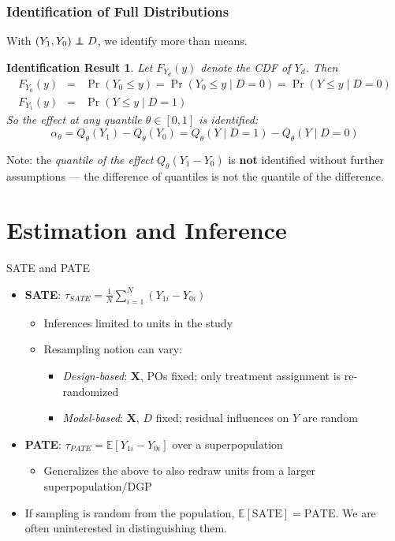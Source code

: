 \documentclass[xcolor=dvipsnames]{beamer}
\newcommand\E{\mathbb{E}}
\newcommand\X{{\bm X}}
\newcommand\indep{\protect\mathpalette{\protect\independenT}{\perp}}
\def\independenT#1#2{\mathrel{\rlap{$#1#2$}\mkern2mu{#1#2}}}
\newtheorem{ires}{Identification Result}
\begin{document}
\begin{frame}
\frametitle{Identification of Full Distributions}
\small
With $(Y_1,Y_0) \indep D$, we identify more than means.

\begin{ires}\small
Let $F_{Y_d}(y)$ denote the CDF of $Y_d$.  Then
\begin{eqnarray*}
F_{Y_0}(y) &=& \Pr(Y_0\leq y) = \Pr(Y_0\leq y \mid D=0) = \Pr(Y\leq y \mid D=0) \\
F_{Y_1}(y) &=& \Pr(Y\leq y \mid D=1)
\end{eqnarray*}
So the effect at any quantile $\theta\in[0,1]$ is identified:
\[
\alpha_{\theta}=Q_\theta(Y_1)-Q_\theta(Y_0)=Q_\theta(Y\mid D\!=\!1)-Q_\theta(Y\mid D\!=\!0)
\]
\end{ires}

\pause
\medskip
Note: the \textit{quantile of the effect} $Q_\theta(Y_1 - Y_0)$ is \textbf{not} identified without further assumptions --- the difference of quantiles is not the quantile of the difference.
\end{frame}


\section{Estimation and Inference}

\begin{frame}{SATE and PATE}
\small
\begin{itemize}
\item<1-> \textbf{SATE}: $\tau_{SATE} = \frac{1}{N}\sum_{i=1}^N (Y_{1i} - Y_{0i})$ \medskip
  \begin{itemize}
  \footnotesize
   \item Inferences limited to units in the study
   \item Resampling notion can vary:
   \begin{itemize}
   \scriptsize
   \item \textit{Design-based}: $\X$, POs fixed; only treatment assignment is re-randomized
   \item \textit{Model-based}: $\X$, $D$ fixed; residual influences on $Y$ are random
   \end{itemize}
  \end{itemize}\bigskip
\item<2-> \textbf{PATE}: $\tau_{PATE} = \E[Y_{1i} - Y_{0i}]$ over a superpopulation \medskip
 \begin{itemize}
  \footnotesize
  \item Generalizes the above to also redraw units from a larger superpopulation/DGP
  \end{itemize}\bigskip
\item<3-> If sampling is random from the population, $\E[\text{SATE}]=\text{PATE}$.  We are often uninterested in distinguishing them.
\end{itemize}
\end{frame}
\end{document}
